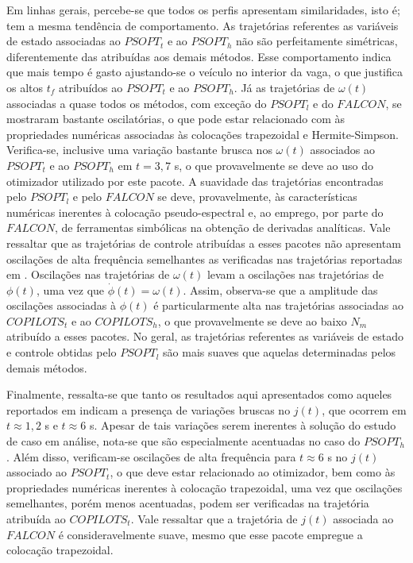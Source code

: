 Em linhas gerais, percebe-se que todos os perfis apresentam similaridades, isto é; tem a mesma tendência de comportamento. As trajetórias referentes as variáveis de estado associadas ao $PSOPT_t$ e ao $PSOPT_h$ não são perfeitamente simétricas, diferentemente das atribuídas aos demais métodos. Esse comportamento indica que mais tempo é gasto ajustando-se o veículo no interior da vaga, o que justifica os altos $t_f$ atribuídos ao $PSOPT_t$ e ao $PSOPT_h$. Já as trajetórias de $\omega(t)$ associadas a quase todos os métodos, com exceção do $PSOPT_l$ e do $FALCON$, se mostraram bastante oscilatórias, o que pode estar relacionado com às propriedades numéricas associadas às colocações trapezoidal e Hermite-Simpson. Verifica-se, inclusive uma variação bastante brusca nos $\omega(t)$ associados ao $PSOPT_t$ e ao $PSOPT_h$ em $t = 3,7$ s, o que provavelmente se deve ao uso do otimizador utilizado por este pacote. A suavidade das trajetórias encontradas pelo $PSOPT_l$ e pelo $FALCON$ se deve, provavelmente, às características numéricas inerentes à colocação pseudo-espectral e, ao emprego, por parte do $FALCON$, de ferramentas simbólicas na obtenção de derivadas analíticas. Vale ressaltar que as trajetórias de controle atribuídas a esses pacotes não apresentam oscilações de alta frequência semelhantes as verificadas nas trajetórias reportadas em . Oscilações nas trajetórias de $\omega(t)$ levam a oscilações nas trajetórias de $\phi(t)$, uma vez que $\dot{\phi}(t) = \omega(t)$. Assim, observa-se que a amplitude das oscilações associadas à $ \phi(t) $ é particularmente alta nas trajetórias associadas ao $COPILOTS_t$ e ao $COPILOTS_h$, o que provavelmente se deve ao baixo $N_m$ atribuído a esses pacotes. No geral, as trajetórias referentes as variáveis de estado e controle obtidas pelo $PSOPT_l$ são mais suaves que aquelas determinadas pelos  demais métodos. 

Finalmente, ressalta-se que tanto os resultados aqui apresentados como aqueles reportados em  indicam a presença de variações bruscas no $j(t)$, que ocorrem em $t \approx 1,2$ s e $t \approx 6$ s. Apesar de tais variações serem inerentes à solução do estudo de caso em análise, nota-se que são especialmente acentuadas no caso do $PSOPT_h$. Além disso, verificam-se oscilações de alta frequência para $t \approx 6$ s no $j(t)$ associado ao $PSOPT_t$, o que deve estar relacionado ao otimizador, bem como às propriedades numéricas inerentes à colocação trapezoidal, uma vez que oscilações semelhantes, porém menos acentuadas, podem ser verificadas na trajetória atribuída ao $COPILOTS_t$. Vale ressaltar que a trajetória de $j(t)$ associada ao $FALCON$ é consideravelmente suave, mesmo que esse pacote empregue a colocação trapezoidal. 

